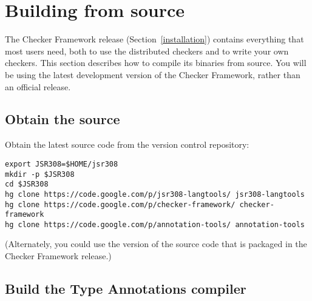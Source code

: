 \section{Building from source\label{build-source}}

The Checker Framework release (Section~\ref{installation}) contains
everything that most users need, both to use the distributed checkers and
to write your own checkers.  This section describes how to compile its
binaries from source.  You will be using the latest development version of
the Checker Framework, rather than an official release.



\subsection{Obtain the source}

Obtain the latest source code from the version control repository:

\begin{Verbatim}
export JSR308=$HOME/jsr308
mkdir -p $JSR308
cd $JSR308
hg clone https://code.google.com/p/jsr308-langtools/ jsr308-langtools
hg clone https://code.google.com/p/checker-framework/ checker-framework
hg clone https://code.google.com/p/annotation-tools/ annotation-tools
\end{Verbatim}

\noindent
(Alternately, you could use the version of the source code that is packaged
in the Checker Framework release.)



\subsection{Build the Type Annotations compiler}

